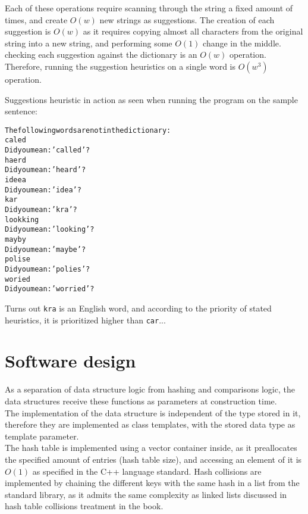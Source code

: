 \documentclass[a4paper]{article}
\begin{document}
Each of these operations require scanning through the string a fixed amount of times, and create $O(w)$ new strings as suggestions. The creation of each suggestion is $O(w)$ as it requires copying almost all characters from the original string into a new string, and performing some $O(1)$ change in the middle. checking each suggestion against the dictionary is an $O(w)$ operation. Therefore, running the suggestion heuristics on a single word is $O(w^3)$ operation.

Suggestions heuristic in action as seen when running the program on the sample sentence:
\begin{alltt}
	The following words are not in the dictionary:
	caled
	Did you mean: 'called'?
	haerd
	Did you mean: 'heard'?
	ideea
	Did you mean: 'idea'?
	kar
	Did you mean: 'kra'?
	lookking
	Did you mean: 'looking'?
	mayby
	Did you mean: 'maybe'?
	polise
	Did you mean: 'polies'?
	woried
	Did you mean: 'worried'?
\end{alltt}

Turns out \texttt{kra} is an English word, and according to the priority of stated heuristics, it is prioritized higher than \texttt{car}...

\section{Software design}

As a separation of data structure logic from hashing and comparisons logic, the data structures receive these functions as parameters at construction time.\\

The implementation of the data structure is independent of the type stored in it, therefore they are implemented as class templates, with the stored data type as template parameter.\\

The hash table is implemented using a vector container inside, as it preallocates the specified amount of entries (hash table size), and accessing an element of it is $O(1)$ as specified in the C++ language standard. Hash collisions are implemented by chaining the different keys with the same hash in a list from the standard library, as it admits the same complexity as linked lists discussed in hash table collisions treatment in the book.\\
\end{document}
